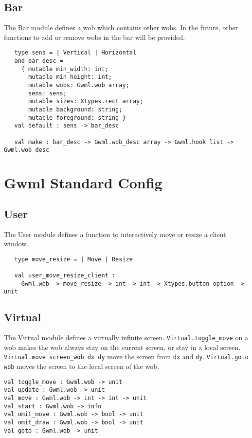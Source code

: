 \documentclass{book}
\begin{document}
\subsection{\bf Bar}

   The Bar module defines a wob which contains other wobs. In the future, 
other functions to add or remove wobs in the bar will be provided.

\begin{verbatim}
   type sens = | Vertical | Horizontal
   and bar_desc =
     { mutable min_width: int;
       mutable min_height: int;
       mutable wobs: Gwml.wob array;
       sens: sens;
       mutable sizes: Xtypes.rect array;
       mutable background: string;
       mutable foreground: string }
   val default : sens -> bar_desc

   val make : bar_desc -> Gwml.wob_desc array -> Gwml.hook list -> Gwml.wob_desc
\end{verbatim}
 
\section{Gwml Standard Config}

\subsection{\bf User}

  The User module defines a function to interactively move or resize a 
client window.

\begin{verbatim}
   type move_resize = | Move | Resize

   val user_move_resize_client :
     Gwml.wob -> move_resize -> int -> int -> Xtypes.button option -> unit
\end{verbatim}

\subsection{\bf Virtual}

  The Virtual module defines a virtually infinite screen. 
{\tt Virtual.toggle\_move} on a wob makes the wob always stay on the 
current screen, or stay in a local screen. {\tt Virtual.move screen\_wob 
dx dy} move the screen from {\tt dx} and {\tt dy}. {\tt Virtual.goto wob} 
moves the screen to the local screen of the wob.

\begin{verbatim}
val toggle_move : Gwml.wob -> unit
val update : Gwml.wob -> unit
val move : Gwml.wob -> int -> int -> unit
val start : Gwml.wob -> info
val omit_move : Gwml.wob -> bool -> unit
val omit_draw : Gwml.wob -> bool -> unit
val goto : Gwml.wob -> unit
\end{verbatim}
\end{document}
